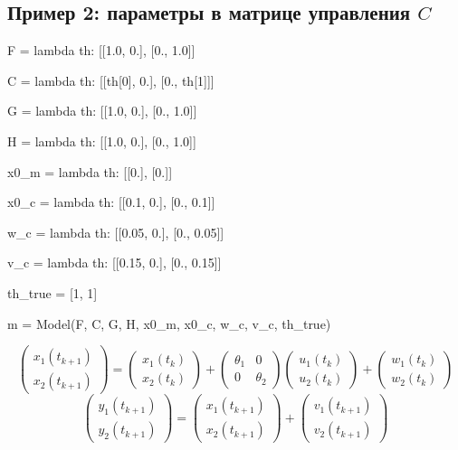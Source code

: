 \documentclass[a4paper,14pt]{extarticle}
\newcommand{\fut}[0]{t_{k+1}}
\begin{document}
\newpage %
\subsection{Пример 2: параметры в матрице управления $C$}

\begin{pycode}[model2]
F = lambda th: [[1.0, 0.],
                [0., 1.0]]

C = lambda th: [[th[0], 0.],
                [0., th[1]]]

G = lambda th: [[1.0, 0.],
                [0., 1.0]]

H = lambda th: [[1.0, 0.],
                [0., 1.0]]

x0_m = lambda th: [[0.],
                   [0.]]

x0_c = lambda th: [[0.1, 0.],
                   [0., 0.1]]

w_c = lambda th: [[0.05, 0.],
                  [0., 0.05]]

v_c = lambda th: [[0.15, 0.],
                  [0., 0.15]]

th_true = [1, 1]

m = Model(F, C, G, H, x0_m, x0_c, w_c, v_c, th_true)
\end{pycode}

\[
  \begin{pmatrix} x_1(\fut) \\ x_2(\fut) \end{pmatrix} =
  \begin{pmatrix} x_1(t_k) \\ x_2(t_k) \end{pmatrix} +
  \begin{pmatrix} \theta_1 & 0 \\ 0 & \theta_2 \end{pmatrix}
  \begin{pmatrix} u_1(t_k) \\ u_2(t_k) \end{pmatrix}
  + \begin{pmatrix} w_1(t_k) \\ w_2(t_k) \end{pmatrix}
\]
\[
  \begin{pmatrix} y_1(\fut) \\ y_2(\fut) \end{pmatrix} =
  \begin{pmatrix} x_1(\fut) \\ x_2(\fut) \end{pmatrix} +
  \begin{pmatrix} v_1(\fut) \\ v_2(\fut) \end{pmatrix}
\]
\end{document}
